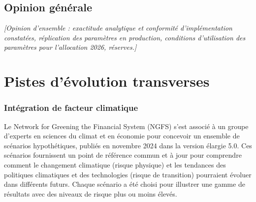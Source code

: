 \documentclass[11pt,a4paper]{article}
\newcommand{\ph}[1]{\textcolor{nxgray}{\itshape #1}}
\begin{document}
\subsection{Opinion générale}
\ph{[Opinion d'ensemble : exactitude analytique et conformité d'implémentation constatées, réplication des paramètres en production, conditions d'utilisation des paramètres pour l'allocation 2026, réserves.]}

\section{Pistes d'évolution transverses}

\subsubsection*{Intégration de facteur climatique}

Le Network for Greening the Financial System (NGFS) s'est associé à un groupe d'experts en sciences du climat et en économie pour concevoir un ensemble de scénarios hypothétiques, publiés en novembre 2024 dans la version élargie 5.0. 
Ces scénarios fournissent un point de référence commun et à jour pour comprendre comment le changement climatique (risque physique) et les tendances des politiques climatiques et des technologies (risque de transition) pourraient évoluer dans différents futurs. Chaque scénario a été choisi pour illustrer une gamme de résultats avec des niveaux de risque plus ou moins élevés.
\end{document}
